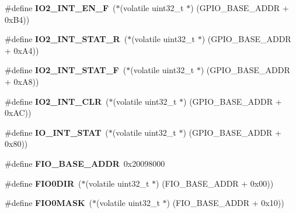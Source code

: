 \begin{DoxyCompactItemize}
\item 
\mbox{\label{group__lpc24xx__regs_ga6797ac769fb9313a0ca4b0e83424800a}} 
\#define {\bfseries I\+O2\+\_\+\+I\+N\+T\+\_\+\+E\+N\+\_\+F}~($\ast$(volatile uint32\+\_\+t $\ast$) (G\+P\+I\+O\+\_\+\+B\+A\+S\+E\+\_\+\+A\+D\+DR + 0x\+B4))
\item 
\mbox{\label{group__lpc24xx__regs_gaab00d66e6b869ddbc2d337b9f59d5fb8}} 
\#define {\bfseries I\+O2\+\_\+\+I\+N\+T\+\_\+\+S\+T\+A\+T\+\_\+R}~($\ast$(volatile uint32\+\_\+t $\ast$) (G\+P\+I\+O\+\_\+\+B\+A\+S\+E\+\_\+\+A\+D\+DR + 0x\+A4))
\item 
\mbox{\label{group__lpc24xx__regs_ga4ae5188d05b923d9d11b52b08300fd60}} 
\#define {\bfseries I\+O2\+\_\+\+I\+N\+T\+\_\+\+S\+T\+A\+T\+\_\+F}~($\ast$(volatile uint32\+\_\+t $\ast$) (G\+P\+I\+O\+\_\+\+B\+A\+S\+E\+\_\+\+A\+D\+DR + 0x\+A8))
\item 
\mbox{\label{group__lpc24xx__regs_gabfd5d9af00cd97db6b054d78f4fe866b}} 
\#define {\bfseries I\+O2\+\_\+\+I\+N\+T\+\_\+\+C\+LR}~($\ast$(volatile uint32\+\_\+t $\ast$) (G\+P\+I\+O\+\_\+\+B\+A\+S\+E\+\_\+\+A\+D\+DR + 0x\+A\+C))
\item 
\mbox{\label{group__lpc24xx__regs_ga200fc46de858bb2357b2fd9879bede0b}} 
\#define {\bfseries I\+O\+\_\+\+I\+N\+T\+\_\+\+S\+T\+AT}~($\ast$(volatile uint32\+\_\+t $\ast$) (G\+P\+I\+O\+\_\+\+B\+A\+S\+E\+\_\+\+A\+D\+DR + 0x80))
\item 
\mbox{\label{group__lpc24xx__regs_ga3fbba921d157c2d51789d17deb312173}} 
\#define {\bfseries F\+I\+O\+\_\+\+B\+A\+S\+E\+\_\+\+A\+D\+DR}~0x20098000
\item 
\mbox{\label{group__lpc24xx__regs_ga5ecdb9b0bd11b7dfefb4decf8337ccbd}} 
\#define {\bfseries F\+I\+O0\+D\+IR}~($\ast$(volatile uint32\+\_\+t $\ast$) (F\+I\+O\+\_\+\+B\+A\+S\+E\+\_\+\+A\+D\+DR + 0x00))
\item 
\mbox{\label{group__lpc24xx__regs_ga0af2c8f6a95a766b32d8709fafac6baa}} 
\#define {\bfseries F\+I\+O0\+M\+A\+SK}~($\ast$(volatile uint32\+\_\+t $\ast$) (F\+I\+O\+\_\+\+B\+A\+S\+E\+\_\+\+A\+D\+DR + 0x10))

\end{DoxyCompactItemize}
